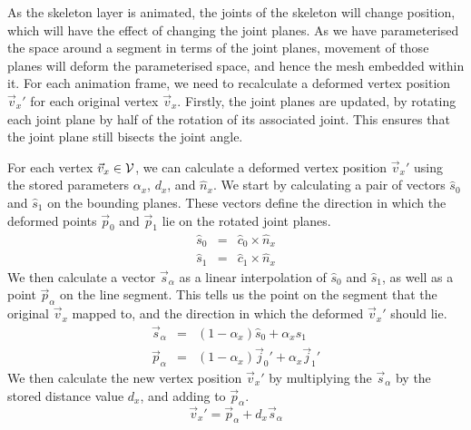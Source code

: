 As the skeleton layer is animated, the joints of the skeleton will change position, which will have the effect of changing the joint planes. As we have parameterised the space around a segment in terms of the joint planes, movement of those planes will deform the parameterised space, and hence the mesh embedded within it. For each animation frame, we need to recalculate a deformed vertex position $\vec{v}_x'$ for each original vertex $\vec{v}_x$. Firstly, the joint planes are updated, by rotating each joint plane by half of the rotation of its associated joint. This ensures that the joint plane still bisects the joint angle.

For each vertex $\vec{v}_x \in {\cal V}$, we can calculate a deformed vertex position $\vec{v}_x'$ using the stored parameters $\alpha_x$, $d_x$, and $\hat{n}_x$. We start by calculating a pair of vectors $\hat{s}_0$ and $\hat{s}_1$ on the bounding planes. These vectors define the direction in which the deformed points $\vec{p}_0$ and $\vec{p}_1$ lie on the rotated joint planes.
\begin{eqnarray} \label{eqn:normals}
\hat{s}_0 & = & \hat{c}_0 \times \hat{n}_x \\ 
\hat{s}_1 & = & \hat{c}_1 \times \hat{n}_x
\end{eqnarray}
We then calculate a vector $\vec{s}_\alpha$ as a linear interpolation of $\hat{s}_0$ and $\hat{s}_1$, as well as a point $\vec{p}_\alpha$ on the line segment. This tells us the point on the segment that the original $\vec{v}_x$ mapped to, and the direction in which the deformed $\vec{v}_x'$ should lie.
\begin{eqnarray}
\vec{s}_\alpha & = & (1 - \alpha_x) \hat{s}_0 + \alpha_x \hat{s}_1 \\
\vec{p}_\alpha & = & (1 - \alpha_x) \vec{j}_0' + \alpha_x \vec{j}_1' 
\end{eqnarray}
We then calculate the new vertex position $\vec{v}_x'$ by multiplying the $\vec{s}_\alpha$ by the stored distance value $d_x$, and adding to $\vec{p}_\alpha$.
\begin{equation}
\vec{v}_x' = \vec{p}_\alpha + d_x \vec{s}_\alpha
\end{equation}
